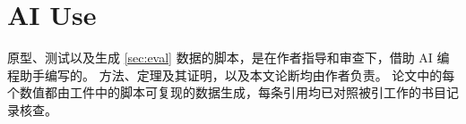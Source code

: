 \section*{AI Use}
原型、测试以及生成 \cref{sec:eval} 数据的脚本，是在作者指导和审查下，借助 AI 编程助手编写的。
方法、定理及其证明，以及本文论断均由作者负责。
论文中的每个数值都由工件中的脚本可复现的数据生成，每条引用均已对照被引工作的书目记录核查。
